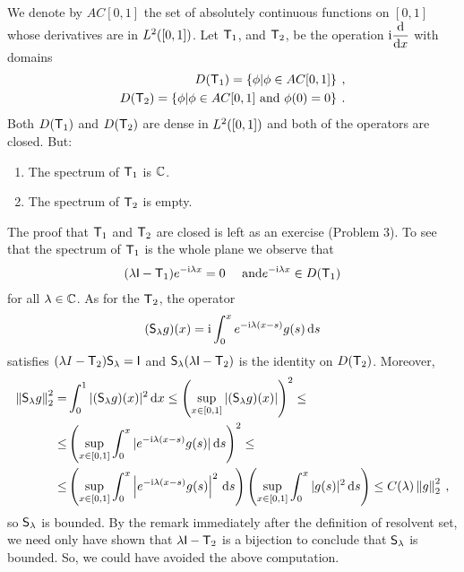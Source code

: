 \begin{example}
We denote by $AC[0, 1]$ the set of absolutely continuous functions on $[0, 1]$ whose derivatives are in $L^{2}([0,1])$. Let $\mathsf{T}_1$, and $\mathsf{T}_2$, be the operation $\mathrm{i} \dfrac{\mathrm{d}}{\mathrm{d}x}$ with domains
\begin{align}
    D(\mathsf{T}_1) = \left \lbrace \phi | \phi \in AC[0,1] \right \rbrace \:, \\
    D(\mathsf{T}_2) = \left \lbrace \phi | \phi \in AC[0,1] \text{ and } \phi(0)=0 \right \rbrace \:.
\end{align}
Both $D(\mathsf{T}_1)$ and $D(\mathsf{T}_2)$ are dense in $L^{2}([0,1])$ and both of the operators are closed. But: \begin{enumerate}
    \item The spectrum of $\mathsf{T}_1$ is $\mathbb{C}$.
    \item The spectrum of $\mathsf{T}_2$ is empty.
\end{enumerate}

The proof that $\mathsf{T}_1$ and $\mathsf{T}_2$ are closed is left as an exercise (Problem 3). To see that the spectrum of $\mathsf{T}_1$ is the whole plane we observe that
\begin{align}
    (\lambda \mathsf{I} - \mathsf{T}_1) e^{-\mathrm{i} \lambda x} = 0 \quad \text{ and} e^{-\mathrm{i} \lambda x} \in D(\mathsf{T}_1)
\end{align}
for all $\lambda \in \mathbb{C}$. As for the $\mathsf{T}_2$, the operator \begin{align}
    (\mathsf{S}_\lambda g)(x) = \mathrm{i} \int_0^x e^{-\mathrm{i} \lambda(x-s)} g(s) \, \mathrm{d} s
\end{align}
satisfies $(\lambda I - \mathsf{T}_2) \mathsf{S}_\lambda = \mathsf{I}$ and $\mathsf{S}_\lambda (\lambda \mathsf{I} - \mathsf{T}_2)$ is the identity on $D(\mathsf{T}_2)$. Moreover, 
\begin{align}
    \left \Vert \mathsf{S}_\lambda g \right \Vert_2^2 =& \int_0^1 |(\mathsf{S}_\lambda g)(x)|^2 \, \mathrm{d} x 
    \leq \left( \sup_{x \in [0,1]} |(\mathsf{S}_\lambda g)(x)| \right)^2 
    \leq \\ \leq&
     \left( \sup_{x \in [0,1]} \int_0^x |e^{-\mathrm{i}\lambda(x-s)} g(s)|  \, \mathrm{d} s \right)^2 \nonumber
    \leq \\ \leq&
    \left( \sup_{x \in [0,1]} \int_0^x \left|e^{-\mathrm{i}\lambda(x-s)} g(s) \right|^2  \, \mathrm{d} s \right)
    \left( \sup_{x \in [0,1]} \int_0^x |g(s)|^2 \, \mathrm{d} s \right)
    \leq C(\lambda) \left \Vert g \right \Vert_2^2 \:, \nonumber
\end{align}
so $\mathsf{S}_\lambda$ is bounded. By the remark immediately after the definition of resolvent set, we need only have shown that $\lambda \mathsf{I} - \mathsf{T}_2$ is a bijection to conclude that $\mathsf{S}_\lambda$ is bounded. So, we could have avoided the above computation.

\end{example}

